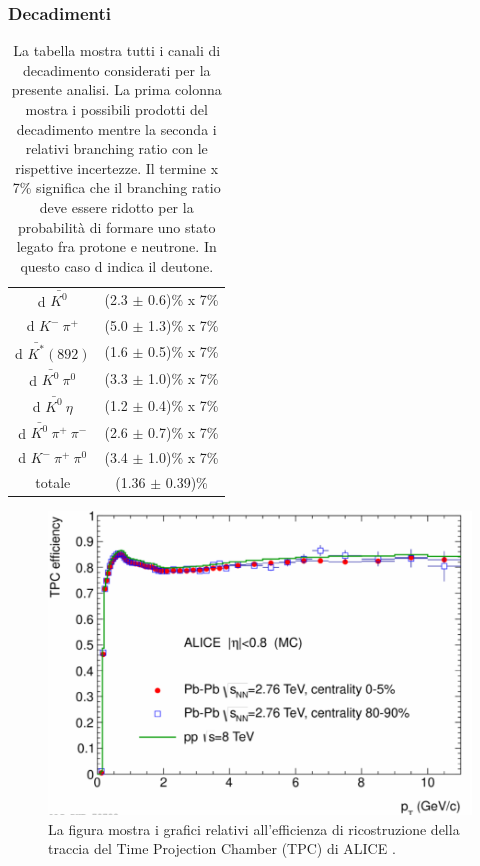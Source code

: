 \documentclass[11pt]{beamer}
\begin{document}
	\begin{frame}
		\frametitle{Decadimenti}
		\begin{table}[h]
			\centering
			\begin{tabular}{c|c}
				\hline
				\cellcolor{yellow} \text{Channel} & \cellcolor{yellow} \text{Branching ratio} \\
				\hline
				d $\bar{K^0}$ & (2.3 $\pm$ 0.6)\% x 7\% \\
				\hline
				d $K^- \ \pi^+$ &  (5.0 $\pm$ 1.3)\% x 7\% \\
				\hline
				d $\bar{K^*}(892)$ &  (1.6 $\pm$ 0.5)\% x 7\% \\
				\hline
				d $\bar{K^0} \ \pi^0$ &  (3.3 $\pm$ 1.0)\% x 7\% \\
				\hline
				d $\bar{K^0} \ \eta$ &  (1.2 $\pm$ 0.4)\% x 7\% \\
				\hline
				d $\bar{K^0} \ \pi^+ \ \pi^-$ &  (2.6 $\pm$ 0.7)\% x 7\% \\
				\hline
				d $K^- \ \pi^+ \ \pi^0$ &  (3.4 $\pm$ 1.0)\% x 7\% \\
				\hline
				totale & (1.36 $\pm$ 0.39)\% \\
				\hline
			\end{tabular}
			\caption{La tabella mostra tutti i canali di decadimento considerati per la presente analisi. La prima colonna mostra i possibili prodotti del decadimento mentre la seconda i relativi branching ratio con le rispettive incertezze. Il termine x 7\% significa che il branching ratio deve essere ridotto per la probabilità di formare uno stato legato fra protone e neutrone. In questo caso d indica il deutone.}
			\label{tab:decay_channel}
		\end{table}
		
	\end{frame}
	
	\begin{frame}
		
		\begin{figure}		
			\centering
			\includegraphics[width=0.7\linewidth]{pictures/track_finding_efficiency_2.png}
			\caption{La figura mostra i grafici relativi all'efficienza di ricostruzione della traccia del Time Projection Chamber (TPC) di ALICE \cite{CERN-LHCC-2015-001}.}
		\end{figure}
	\end{frame}
	
\end{document}
